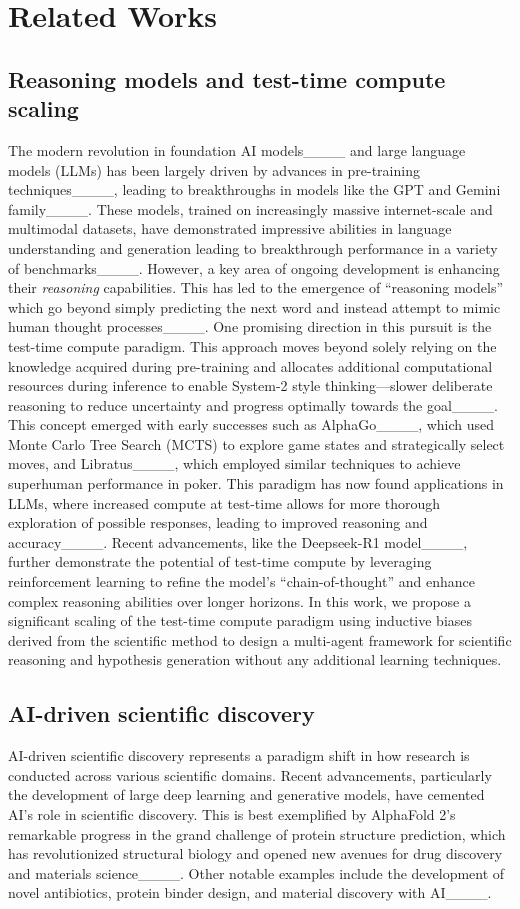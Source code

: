 \section{Related Works}
\subsection{Reasoning models and test-time compute scaling}
The modern revolution in foundation AI models____ and large language models (LLMs) has been largely driven by advances in pre-training techniques____, leading to breakthroughs in models like the GPT and Gemini family____. These models, trained on increasingly massive internet-scale and multimodal datasets, have demonstrated impressive abilities in language understanding and generation leading to breakthrough performance in a variety of benchmarks____.  However, a key area of ongoing development is enhancing their \textit{reasoning} capabilities. This has led to the emergence of ``reasoning models'' which go beyond simply predicting the next word and instead attempt to mimic human thought processes____. One promising direction in this pursuit is the test-time compute paradigm.  This approach moves beyond solely relying on the knowledge acquired during pre-training and allocates additional computational resources during inference to enable System-2 style thinking---slower deliberate reasoning to reduce uncertainty and progress optimally towards the goal____. This concept emerged with early successes such as AlphaGo____, which used Monte Carlo Tree Search (MCTS) to explore game states and strategically select moves, and Libratus____, which employed similar techniques to achieve superhuman performance in poker. This paradigm has now found applications in LLMs, where increased compute at test-time allows for more thorough exploration of possible responses, leading to improved reasoning and accuracy____. Recent advancements, like the Deepseek-R1 model____, further demonstrate the potential of test-time compute by leveraging reinforcement learning to refine the model's ``chain-of-thought'' and enhance complex reasoning abilities over longer horizons. In this work, we propose a significant scaling of the test-time compute paradigm using inductive biases derived from the scientific method to design a multi-agent framework for scientific reasoning and hypothesis generation without any additional learning techniques.

\subsection{AI-driven scientific discovery}
AI-driven scientific discovery represents a paradigm shift in how research is conducted across various scientific domains. Recent advancements, particularly the development of large deep learning and generative models, have cemented AI's role in scientific discovery. This is best exemplified by AlphaFold 2's remarkable progress in the grand challenge of protein structure prediction, which has revolutionized structural biology and opened new avenues for drug discovery and materials science____. Other notable examples include the development of novel antibiotics, protein binder design,  and material discovery with AI____. 

